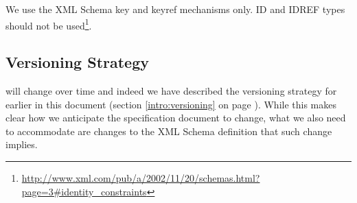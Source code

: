 We use the XML Schema key and keyref mechanisms only. ID and IDREF
types should not be used\footnote{\url{http://www.xml.com/pub/a/2002/11/20/schemas.html?page=3\#identity_constraints}}.

\subsection{Versioning Strategy}

\pharmml will change over time and indeed we have described the
versioning strategy for \pharmml earlier in this document (section
\ref{intro:versioning} on page \pageref{intro:versioning}). While this
makes clear how we anticipate the specification document to change,
what we also need to accommodate are changes to the XML Schema
definition that such change implies.


